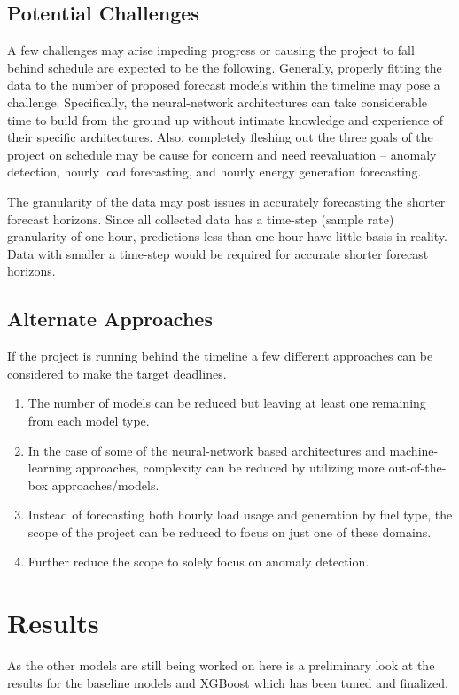 \documentclass[sigconf]{acmart}
\begin{document}
\subsection{Potential Challenges}
A few challenges may arise impeding progress or causing the project to fall behind schedule are expected to be the following. 
Generally, properly fitting the data to the number of proposed forecast models within the timeline may pose a challenge. Specifically, the neural-network architectures can take considerable time to build from the ground up without intimate knowledge and experience of their specific architectures. Also, completely fleshing out the three goals of the project on schedule may be cause for concern and need reevaluation -- anomaly detection, hourly load forecasting, and hourly energy generation forecasting.

The granularity of the data may post issues in accurately forecasting the shorter forecast horizons. Since all collected data has a time-step (sample rate) granularity of one hour, predictions less than one hour have little basis in reality. Data with smaller a time-step would be required for accurate shorter forecast horizons.

\subsection{Alternate Approaches}
If the project is running behind the timeline a few different approaches can be considered to make the target deadlines. 

\begin{enumerate}
  \item The number of models can be reduced but leaving at least one remaining from each model type. 
  \item In the case of some of the neural-network based architectures and machine-learning approaches, complexity can be reduced by utilizing more out-of-the-box approaches/models. 
  \item Instead of forecasting both hourly load usage and generation by fuel type, the scope of the project can be reduced to focus on just one of these domains.
  \item Further reduce the scope to solely focus on anomaly detection.
\end{enumerate}

\section{Results}
As the other models are still being worked on here is a preliminary look at the results for the baseline models and XGBoost which has been tuned and finalized.
\end{document}
